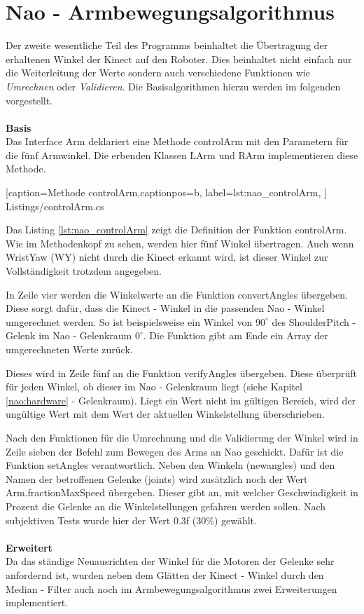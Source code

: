 \section{Nao -  Armbewegungsalgorithmus}\label{s:naoAlgo}
Der zweite wesentliche Teil des Programms beinhaltet die Übertragung der erhaltenen Winkel der Kinect auf den Roboter. Dies beinhaltet nicht einfach nur die Weiterleitung der Werte sondern auch verschiedene Funktionen wie \textit{Umrechnen} oder \textit{Validieren}. Die Basisalgorithmen hierzu werden im folgenden vorgestellt.
\\
\\
\textbf{Basis}
\\
Das Interface \textsf{Arm} deklariert eine Methode \textsf{controlArm} mit den Parametern für die fünf Armwinkel. Die erbenden Klassen \textsf{LArm} und \textsf{RArm} implementieren diese Methode. 


    [caption={Methode \textsf{controlArm}},captionpos=b,
       label=lst:nao_controlArm,
       ]	
 {Listings/controlArm.cs}

Das Listing \ref{lst:nao_controlArm} zeigt die Definition der Funktion \textsf{controlArm}. Wie im Methodenkopf zu sehen, werden hier fünf Winkel übertragen. Auch wenn WristYaw (WY) nicht durch die Kinect erkannt wird, ist dieser Winkel zur Vollständigkeit trotzdem angegeben. 

In Zeile vier werden die Winkelwerte an die Funktion \textsf{convertAngles} übergeben. Diese sorgt dafür, dass die Kinect - Winkel in die passenden Nao - Winkel umgerechnet werden. So ist beispielsweise ein Winkel von $90^\circ$ des ShoulderPitch - Gelenk im Nao -  Gelenkraum $0^\circ$. Die Funktion gibt am Ende ein Array der umgerechneten Werte zurück.

Dieses wird in Zeile fünf an die Funktion \textsf{verifyAngles} übergeben. Diese überprüft für jeden Winkel, ob dieser im Nao - Gelenkraum liegt (siehe Kapitel \ref{nao:hardware} - Gelenkraum). Liegt ein Wert nicht im gültigen Bereich, wird der ungültige Wert mit dem Wert der aktuellen Winkelstellung überschrieben.

Nach den Funktionen für die Umrechnung und die Validierung der Winkel wird in Zeile sieben der Befehl zum Bewegen des Arms an Nao geschickt. Dafür ist die Funktion \textsf{setAngles} verantwortlich. Neben den Winkeln (\textsf{newangles}) und den Namen der betroffenen Gelenke (\textsf{joints}) wird zusätzlich noch der Wert \textsf{Arm.fractionMaxSpeed} übergeben. Dieser gibt an, mit welcher Geschwindigkeit in Prozent die Gelenke an die Winkelstellungen gefahren werden sollen. Nach subjektiven Tests wurde hier der Wert 0.3f (30\%) gewählt. 
\\
\\
\textbf{Erweitert}
\\
Da das ständige Neuausrichten der Winkel für die Motoren der Gelenke sehr anfordernd ist, wurden neben dem Glätten der Kinect - Winkel durch den Median - Filter auch noch im Armbewegungsalgorithmus zwei Erweiterungen implementiert.

